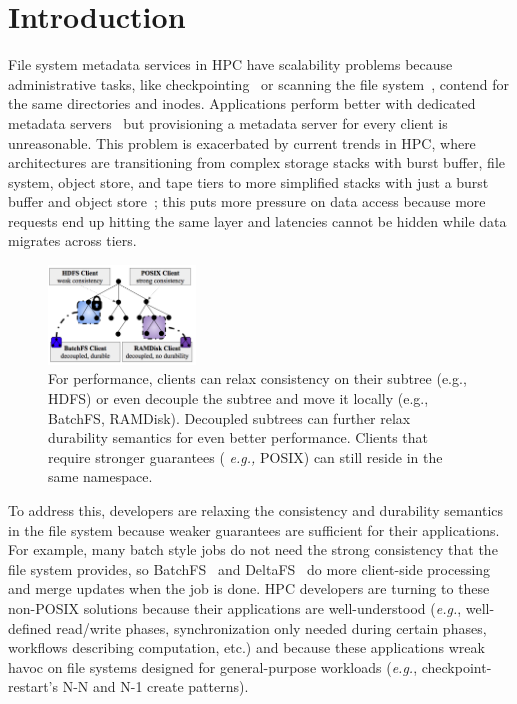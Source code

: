 \section{Introduction}

File system metadata services in HPC have scalability problems because
administrative tasks, like checkpointing~\cite{bent_plfs_2009} or scanning the
file system~\cite{zheng:pdsw2014-batchfs}, contend for the same directories and
inodes. Applications perform better with dedicated metadata
servers~\cite{sevilla:sc15-mantle, ren:sc2014-indexfs} but provisioning a
metadata server for every client is unreasonable. This problem is exacerbated
by current trends in HPC, where architectures are transitioning from complex
storage stacks with burst buffer, file system, object store, and tape tiers to
more simplified stacks with just a burst buffer and object
store~\cite{bent:login16-hpc-trends}; this puts more pressure on data access
because more requests end up hitting the same layer and latencies cannot be
hidden while data migrates across tiers.

\begin{figure}[tb]
\centering
\includegraphics[width=0.35\textwidth]{figures/subtree-policies1.png}

\caption{For performance, clients can relax consistency on their subtree
({e.g.}, HDFS) or even decouple the subtree and move it locally ({e.g.},
BatchFS, RAMDisk). Decoupled subtrees can further relax durability semantics
for even better performance. Clients that require stronger guarantees ({\it
e.g.,} POSIX) can still reside in the same namespace.
}\label{fig:subtree-policies}

\end{figure}

To address this, developers are relaxing the consistency and durability
semantics in the file system because weaker guarantees are sufficient for their
applications. For example, many batch style jobs do not need the strong
consistency that the file system provides, so
BatchFS~\cite{zheng:pdsw2014-batchfs} and DeltaFS~\cite{zheng:pdsw2015-deltafs}
do more client-side processing and merge updates when the job is done. HPC
developers are turning to these non-POSIX solutions because their applications
are well-understood ({\it e.g.}, well-defined read/write phases,
synchronization only needed during certain phases, workflows describing
computation, etc.) and because these applications wreak havoc on file systems designed for
general-purpose workloads ({\it e.g.}, checkpoint-restart's N-N and N-1 create
patterns).

